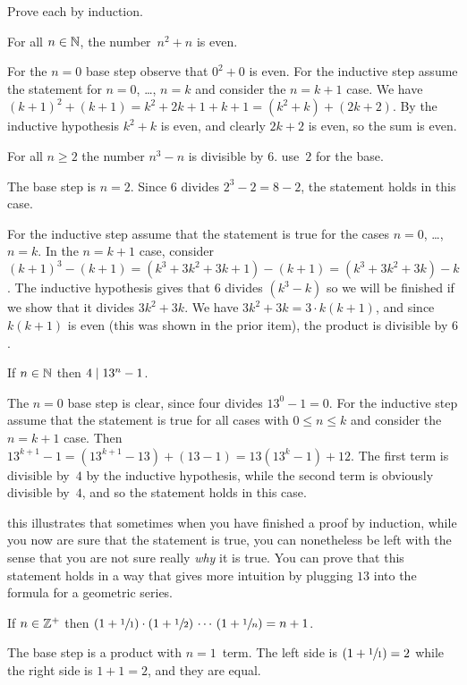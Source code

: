 \documentclass{ibl}  %
\begin{document}
\begin{problem}
Prove each by induction.
\begin{exes}
\begin{exercise}
  For all $n\in\mathbb{N}$, the number~$n^2+n$ is even.
\end{exercise}
\begin{answer}
  For the $n=0$ base step observe that $0^2+0$ is even.
  For the inductive step assume the statement for $n=0$, \ldots, $n=k$
  and consider the $n=k+1$ case.
  We have $(k+1)^2+(k+1)=k^2+2k+1+k+1=(k^2+k)+(2k+2)$. 
  By the inductive hypothesis $k^2+k$ is even, and clearly $2k+2$ is even, 
  so the sum is even.
\end{answer}
\begin{exercise} 
  For all $n\geq 2$ the number $n^3-n$ is divisible by $6$.
  \hint use~$2$ for the base.
\end{exercise}
\begin{answer}
  The base step is $n=2$.
  Since $6$ divides $2^3-2=8-2$, the statement holds in this case.

  For the inductive step assume that the statement is true for 
  the cases $n=0$, \ldots, $n=k$.
  In the $n=k+1$ case, consider 
  $(k+1)^3-(k+1)=(k^3+3k^2+3k+1)-(k+1)=(k^3+3k^2+3k)-k$.
  The inductive hypothesis gives that $6$ divides $(k^3-k)$ so we will
  be finished if we show that it divides  $3k^2+3k$.
  We have $3k^2+3k=3\cdot k(k+1)$, and since
  $k(k+1)$ is even (this was shown in the prior item),
  the product is divisible by $6$.  
\end{answer}
\begin{exercise} 
  If $n\in\mathbb{N}$ then $4\mid 13^n-1$.
\end{exercise}
\begin{answer}
  The $n=0$ base step is clear, since four divides $13^0-1=0$.
  For the inductive step assume that the statement is true for all cases 
  with $0\leq n\leq k$ and consider the $n=k+1$ case.
  Then $13^{k+1}-1=(13^{k+1}-13)+(13-1)=13(13^k-1)+12$.
  The first term is divisible by~$4$ by the inductive hypothesis, while the
  second term is obviously divisible by~$4$, and so the statement holds in 
  this case.

  \remark
  this illustrates that 
  sometimes when you have finished a proof by induction, 
  while you now are sure that the statement is true, 
  you can nonetheless be left with the sense
  that you are not sure really \emph{why} it is true.
  You can prove that this statement holds in a 
  way that gives more intuition by plugging $13$ into the formula for a
  geometric series. 
\end{answer}
\begin{exercise}[\maxlength] 
    If $n\in\mathbb{Z}^+$ then
    $(1+\sfrac{1}{1})\cdot(1+\sfrac{1}{2})\,\cdots\,(1+\sfrac{1}{n})=n+1$.
\end{exercise}
\begin{answer}
  The base step is a product with $n=1$~term.
  The left side is $(1+\sfrac{1}{1})=2$ while the right side is $1+1=2$,
  and they are equal.


\end{answer}
\end{exes}
\end{problem}
\end{document}
